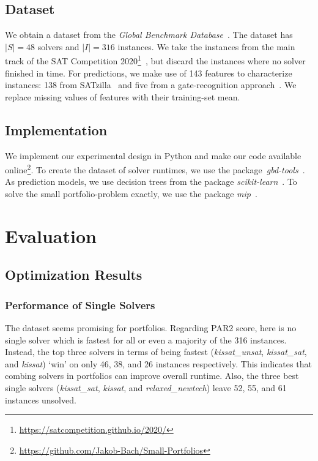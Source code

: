 \documentclass[conference]{IEEEtran}
\begin{document}
\subsection{Dataset}

We obtain a dataset from the \emph{Global Benchmark Database}~\cite{iser2020collaborative}.
The dataset has $|S| = 48$ solvers and $|I| = 316$ instances.
We take the instances from the main track of the SAT Competition 2020\footnote{\url{https://satcompetition.github.io/2020/}}~\cite{balyo2020proceedings}, but discard the instances where no solver finished in time.
For predictions, we make use of 143 features to characterize instances:
138 from SATzilla~\cite{xu2008satzilla, xu2012satzilla2012} and five from a gate-recognition approach~\cite{iser2020recognition}.
We replace missing values of features with their training-set mean.


\subsection{Implementation}

We implement our experimental design in Python and make our code available online\footnote{\url{https://github.com/Jakob-Bach/Small-Portfolios}}.
To create the dataset of solver runtimes, we use the package~\emph{gbd-tools}~\cite{iser2020collaborative}.
As prediction models, we use decision trees from the package \emph{scikit-learn}~\cite{scikit-learn}.
To solve the small portfolio-problem exactly, we use the package \emph{mip}~\cite{python-mip}.

\section{Evaluation}
\label{sec:evaluation}

\subsection{Optimization Results}

\subsubsection{Performance of Single Solvers}

The dataset seems promising for portfolios.
Regarding PAR2 score, here is no single solver which is fastest for all or even a majority of the 316 instances.
Instead, the top three solvers in terms of being fastest (\emph{kissat\_unsat}, \emph{kissat\_sat}, and \emph{kissat}) `win' on only 46, 38, and 26 instances respectively.
This indicates that combing solvers in portfolios can improve overall runtime.
Also, the three best single solvers (\emph{kissat\_sat}, \emph{kissat}, and \emph{relaxed\_newtech}) leave 52, 55, and 61 instances unsolved.
\end{document}
